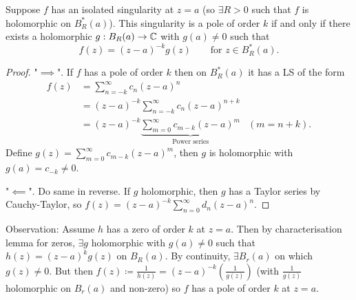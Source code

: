 \documentclass[10pt, a4paper]{article}
\begin{document}
\begin{lemma}
    Suppose $f$ has an isolated singularity at $z = a$
    (so $\exists R > 0$ such that $f$ is holomorphic on $B_{R}^{*}(a)$).
    This singularity is a pole of order $k$ if and only if there exists a holomorphic $g : B_R(a) \to \mathbb{C}$ with $g(a) \neq 0$ such that
    \[
    f(z) = (z - a) ^ {-k}g(z)\qquad \text{for } z \in B_{R}^{*}(a).
    \]

    \begin{proof}
        "$\implies$".
        If $f$ has a pole of order $k$ then on $B_{R}^{*}(a)$ it has a LS of the form
        \begin{align*}
            f(z) &= \sum_{n = -k}^{\infty}c_n(z - a) ^ n \\
            &= (z - a) ^ {-k}\sum_{n = -k}^{\infty}c_n(z - a) ^ {n + k} \\
            &= (z - a) ^ {-k}\underbrace{\sum_{m = 0}^{\infty}c_{m - k}(z - a) ^ m}_{\text{Power series}} &(m = n + k).
        \end{align*}
        Define $g(z) = \sum_{m = 0}^{\infty}c_{m - k}(z - a) ^ m$,
        then $g$ is holomorphic with $g(a) = c_{-k} \neq 0$.

        "$\impliedby$".
        Do same in reverse.
        If $g$ holomorphic,
        then $g$ has a Taylor series by Cauchy-Taylor,
        so $f(z) = (z - a) ^ {-k}\sum_{n = 0}^{\infty}d_n(z - a) ^ n$.
    \end{proof}
\end{lemma}

Observation:
Assume $h$ has a zero of order $k$ at $z = a$.
Then by characterisation lemma for zeros,
$\exists g$ holomorphic with $g(a) \neq 0$ such that $h(z) = (z - a) ^ kg(z)$ on $B_R(a)$.
By continuity,
$\exists B_r(a)$ on which $g(z) \neq 0$.
But then $f(z) \coloneqq \frac{1}{h(z)} = (z - a) ^ {-k}\left(\frac{1}{g(z)}\right)$
(with $\frac{1}{g(z)}$ holomorphic on $B_r(a)$ and non-zero)
so $f$ has a pole of order $k$ at $z = a$.
\end{document}
